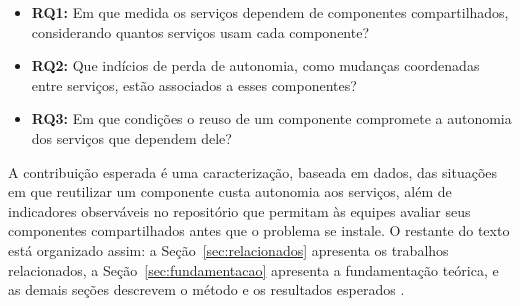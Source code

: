 \begin{itemize}
  \item \textbf{RQ1:} Em que medida os serviços dependem de componentes compartilhados, considerando quantos serviços usam cada componente?
  \item \textbf{RQ2:} Que indícios de perda de autonomia, como mudanças coordenadas entre serviços, estão associados a esses componentes?
  \item \textbf{RQ3:} Em que condições o reuso de um componente compromete a autonomia dos serviços que dependem dele?
\end{itemize}

A contribuição esperada é uma caracterização, baseada em dados, das situações em que reutilizar um componente custa autonomia aos serviços, além de indicadores observáveis no repositório que permitam às equipes avaliar seus componentes compartilhados antes que o problema se instale. O restante do texto está organizado assim: a Seção~\ref{sec:relacionados} apresenta os trabalhos relacionados, a Seção~\ref{sec:fundamentacao} apresenta a fundamentação teórica, e as demais seções descrevem o método e os resultados esperados .
